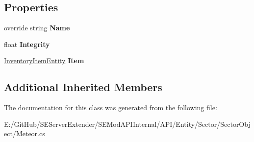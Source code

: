 \subsection*{Properties}
\begin{DoxyCompactItemize}
\item 
\hypertarget{class_s_e_mod_a_p_i_internal_1_1_a_p_i_1_1_entity_1_1_sector_1_1_sector_object_1_1_meteor_ad0014da9f6362f8a05cc05cc41cb8bf3}{}override string {\bfseries Name}\label{class_s_e_mod_a_p_i_internal_1_1_a_p_i_1_1_entity_1_1_sector_1_1_sector_object_1_1_meteor_ad0014da9f6362f8a05cc05cc41cb8bf3}

\item 
\hypertarget{class_s_e_mod_a_p_i_internal_1_1_a_p_i_1_1_entity_1_1_sector_1_1_sector_object_1_1_meteor_a3d28f554153cda447d7d8ada16bdb037}{}float {\bfseries Integrity}\label{class_s_e_mod_a_p_i_internal_1_1_a_p_i_1_1_entity_1_1_sector_1_1_sector_object_1_1_meteor_a3d28f554153cda447d7d8ada16bdb037}

\item 
\hypertarget{class_s_e_mod_a_p_i_internal_1_1_a_p_i_1_1_entity_1_1_sector_1_1_sector_object_1_1_meteor_a33ac90672617709cc918671fa31bad8c}{}\hyperlink{class_s_e_mod_a_p_i_internal_1_1_a_p_i_1_1_entity_1_1_inventory_item_entity}{Inventory\+Item\+Entity} {\bfseries Item}\label{class_s_e_mod_a_p_i_internal_1_1_a_p_i_1_1_entity_1_1_sector_1_1_sector_object_1_1_meteor_a33ac90672617709cc918671fa31bad8c}

\end{DoxyCompactItemize}
\subsection*{Additional Inherited Members}


The documentation for this class was generated from the following file\+:\begin{DoxyCompactItemize}
\item 
E\+:/\+Git\+Hub/\+S\+E\+Server\+Extender/\+S\+E\+Mod\+A\+P\+I\+Internal/\+A\+P\+I/\+Entity/\+Sector/\+Sector\+Object/Meteor.\+cs\end{DoxyCompactItemize}
